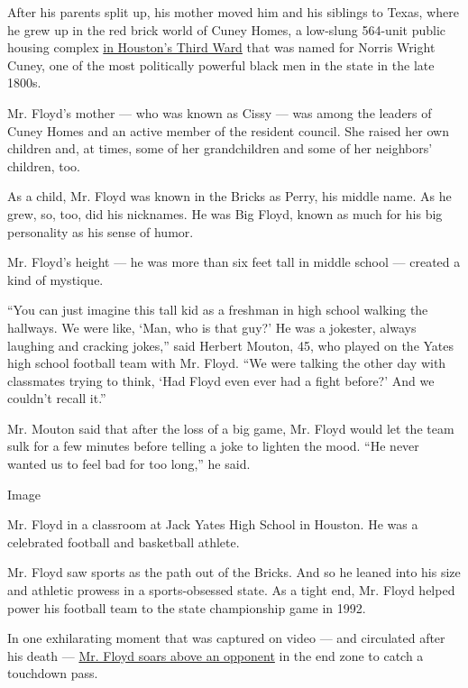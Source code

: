 After his parents split up, his mother moved him and his siblings to
Texas, where he grew up in the red brick world of Cuney Homes, a
low-slung 564-unit public housing complex
\href{https://www.chron.com/news/houston-texas/houston/article/George-Floyd-police-brutality-minneapolis-dead-vid-15296192.php}{in
Houston's Third Ward} that was named for Norris Wright Cuney, one of the
most politically powerful black men in the state in the late 1800s.

Mr. Floyd's mother --- who was known as Cissy --- was among the leaders
of Cuney Homes and an active member of the resident council. She raised
her own children and, at times, some of her grandchildren and some of
her neighbors' children, too.

As a child, Mr. Floyd was known in the Bricks as Perry, his middle name.
As he grew, so, too, did his nicknames. He was Big Floyd, known as much
for his big personality as his sense of humor.

Mr. Floyd's height --- he was more than six feet tall in middle school
--- created a kind of mystique.

``You can just imagine this tall kid as a freshman in high school
walking the hallways. We were like, `Man, who is that guy?' He was a
jokester, always laughing and cracking jokes,'' said Herbert Mouton, 45,
who played on the Yates high school football team with Mr. Floyd. ``We
were talking the other day with classmates trying to think, `Had Floyd
even ever had a fight before?' And we couldn't recall it.''

Mr. Mouton said that after the loss of a big game, Mr. Floyd would let
the team sulk for a few minutes before telling a joke to lighten the
mood. ``He never wanted us to feel bad for too long,'' he said.

Image

Mr. Floyd in a classroom at Jack Yates High School in Houston. He was a
celebrated football and basketball athlete.

Mr. Floyd saw sports as the path out of the Bricks. And so he leaned
into his size and athletic prowess in a sports-obsessed state. As a
tight end, Mr. Floyd helped power his football team to the state
championship game in 1992.

In one exhilarating moment that was captured on video --- and circulated
after his death ---
\href{https://twitter.com/CourtneyABC13/status/1265603534852063233}{Mr.
Floyd soars above an opponent} in the end zone to catch a touchdown
pass.

